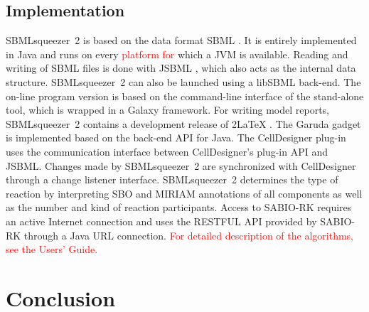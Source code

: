 \documentclass{bioinfo}
\newcommand{\SBMLLaTeX}{{\sffamily\upshape\raisebox{-.35ex}{S\hspace{-.425ex}BML}\hspace{-0.5ex}2\LaTeX}}
\begin{document}
\vspace{-.45cm}
\begin{methods}
\section{Implementation}
SBMLsqueezer~2 is based on the data format SBML \citep{Hucka2004}.
It is entirely implemented in Java\texttrademark{} and runs on every \textcolor{red}{platform for} which a JVM is available.
Reading and writing of SBML files is done with JSBML \citep{Draeger2011b}, which also acts as the internal data structure.
SBMLsqueezer~2 can also be launched using a libSBML \citep{Bornstein2008} back-end.
The on-line program version is based on the command-line interface of the stand-alone tool, which is wrapped in a Galaxy \citep{Goecks2010} framework.
For writing model reports, SBMLsqueezer~2 contains a development release of \SBMLLaTeX{} \citep{Draeger2009}.
The Garuda gadget \citep{Ghosh2011} is implemented based on the back-end API for Java\texttrademark.
The CellDesigner plug-in uses the communication interface between CellDesigner's plug-in API and JSBML.
Changes made by SBMLsqueezer~2 are synchronized with CellDesigner through a change listener interface.
SBMLsqueezer~2 determines the type of reaction by interpreting SBO and MIRIAM annotations \citep{Courtot2011} of all components as well as the number and kind of reaction participants.
Access to SABIO-RK \citep{Wittig2012} requires an active Internet connection and uses the RESTFUL API provided by SABIO-RK through a Java\texttrademark{} URL connection.
\textcolor{red}{For detailed description of the algorithms, see the Users' Guide.}
\end{methods}

%
%
\section{Conclusion}
\end{document}
